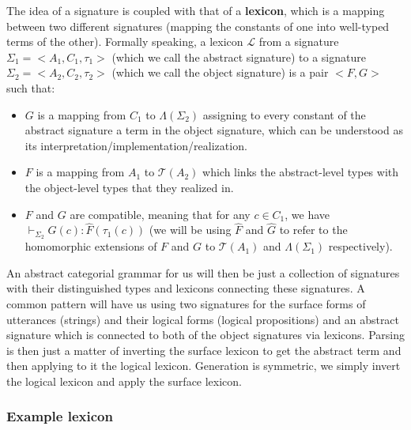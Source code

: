 The idea of a signature is coupled with that of a \textbf{lexicon},
which is a mapping between two different signatures (mapping the
constants of one into well-typed terms of the other). Formally speaking,
a lexicon $\mathcal{L}$ from a signature $\Sigma_1 = \mathopen{<}A_1, C_1,
\tau_1\mathclose{>}$ (which we call the abstract signature) to a
signature $\Sigma_2 = \mathopen{<}A_2, C_2, \tau_2\mathclose{>}$ (which
we call the object signature) is a pair $\mathopen{<}F, G\mathclose{>}$
such that:
\begin{itemize}
\item $G$ is a mapping from $C_1$ to $\Lambda(\Sigma_2)$ assigning to
  every constant of the abstract signature a term in the object
  signature, which can be understood as its
  interpretation/implementation/realization.
\item $F$ is a mapping from $A_1$ to $\mathcal{T}(A_2)$ which links the
  abstract-level types with the object-level types that they realized
  in.
\item $F$ and $G$ are compatible, meaning that for any $c \in C_1$, we
  have $\vdash_{\Sigma_2} G(c) : \hat{F}(\tau_1(c))$ (we will be using
  $\hat{F}$ and $\hat{G}$ to refer to the homomorphic extensions of $F$
  and $G$ to $\mathcal{T}(A_1)$ and $\Lambda(\Sigma_1)$ respectively).
\end{itemize}

An abstract categorial grammar for us will then be just a collection of
signatures with their distinguished types and lexicons connecting these
signatures. A common pattern will have us using two signatures for the
surface forms of utterances (strings) and their logical forms (logical
propositions) and an abstract signature which is connected to both of
the object signatures via lexicons. Parsing is then just a matter of
inverting the surface lexicon to get the abstract term and then applying
to it the logical lexicon. Generation is symmetric, we simply invert the
logical lexicon and apply the surface lexicon.

\subsubsection{Example lexicon}
\label{sssec:example-lex}

\newcommand{\synt}[1]{C_{\textrm{#1}}}

